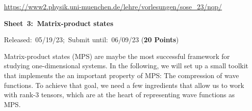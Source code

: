 \documentclass[a4paper, 12pt]{article}
\begin{document}
	   
\vspace*{-13mm}
\noindent{}
\hfill
%
\hfill\hfill
\hfill
\begin{center}
	\small \url{https://www2.physik.uni-muenchen.de/lehre/vorlesungen/sose_23/nqp/}
\end{center}
%
\vspace{8mm}
%
\centerline{\Large\textbf{Sheet~3:~Matrix-product states}}
%
\vspace{3mm}
%
\normalsize\centerline{Released:~05/19/23;~Submit until:~06/09/23 (\textbf{20 Points})}
%
%
%
\vspace{6mm}
%
Matrix-product states (MPS) are maybe the most successful framework for studying one-dimensional systems.
%
In the following, we will set up a small toolkit that implements the an important property of MPS: The compression of wave functions.
%
To achieve that goal, we need a few ingredients that allow us to work with rank-$3$ tensors, which are at the heart of representing wave functions as MPS.
%
\end{document}

